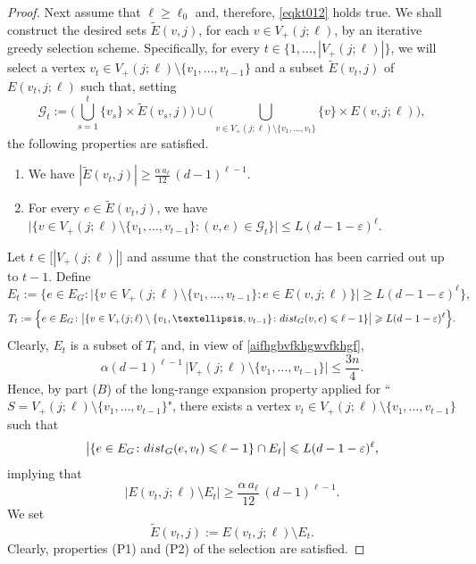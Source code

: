 \documentclass[11pt,leqno]{amsart}
\theoremstyle{remark}
\theoremstyle{plain}
\def\dist{{\rm dist}}
\def\dist{{\rm dist}}
\begin{document}
\begin{proof}
Next assume that $\ell\geqslant \ell_0$ and, therefore, \eqref{eqkt012} holds true. We shall
construct the desired sets $\tilde{E}(v,j)$, for each $v\in V_{+}(j;\ell)$, by an iterative greedy selection scheme.
Specifically, for every $t\in \big\{1,\ldots, |V_{+}(j;\ell)|\big\}$, we will select a vertex
$v_t\in V_{+}(j;\ell)\setminus \{v_1,\dots,v_{t-1}\}$ and
a subset $\tilde{E}(v_t,j)$ of $E(v_t,j;\ell)$ such that, setting
\[ \mathcal{G}_t:=
\Big(\bigcup_{s=1}^t \{v_s\}\times \tilde{E}(v_s,j)\Big)
\cup \Big(\bigcup_{v\in V_{+}(j;\ell)\setminus\{v_1,\ldots,v_t\}} \{v\}\times E(v,j;\ell)\Big),\]
the following properties are satisfied.
\begin{enumerate}
\item [(P1)] We have $|\tilde{E}(v_t,j)|\geqslant \frac{\alpha\,a_\ell}{12}\,(d-1)^{\ell-1}$.
\item [(P2)] For every $e\in \tilde{E}(v_t,j)$, we have
$\big|\{v\in V_{+}(j;\ell)\setminus\{v_1,\ldots,v_{t-1}\}\colon (v,e)\in
\mathcal{G}_t\}\big| \leqslant  L(d-1-\varepsilon)^\ell$.
\end{enumerate}
Let $t\in \big[|V_{+}(j;\ell)|\big]$ and assume that the construction has been carried out up to $t-1$.
Define
\[ E_t:=\big\{e\in E_G\colon \big|\{v\in V_{+}(j;\ell)\setminus\{v_1,\dots,v_{t-1}\}\colon
e\in E(v,j;\ell)\}\big|\geqslant L(d-1-\varepsilon)^\ell\big\}, \]
\[ T_t:= \Big\{e\in E_G\colon
\big|\{v\in V_{+}(j;\ell)\setminus\{v_1,\dots,v_{t-1}\}\colon
\dist_G(v,e)\leqslant \ell-1\}\big|\geqslant L(d-1-\varepsilon)^\ell\Big\}.\]
Clearly, $E_t$ is a subset of  $T_t$
and, in view of \eqref{aifhgbvfkhgwvfkhgf},
$$ \alpha(d-1)^{\ell-1}\, \big|V_{+}(j;\ell)\setminus\{v_1,\dots,v_{t-1}\}\big| \leqslant \frac{3n}{4}. $$
Hence, by part (\hyperref[Part-B]{$B$}) of the long-range expansion property applied for
``$S=V_{+}(j;\ell)\setminus\{v_1,\dots,v_{t-1}\}$", there exists a vertex
$v_t\in V_{+}(j;\ell)\setminus\{v_1,\dots,v_{t-1}\}$ such that
$$ \big|\{e\in E_G\colon \dist_G(e,v_t)\leqslant \ell-1\} \cap E_t\big|\leqslant L(d-1-\varepsilon)^\ell, $$
implying that
$$ |E(v_t,j;\ell)\setminus E_t| \geqslant \frac{\alpha\,a_\ell}{12}\,(d-1)^{\ell-1}. $$
We set
$$ \tilde E(v_t,j):=E(v_t,j;\ell)\setminus E_t. $$
Clearly, properties (P1) and (P2) of the selection are satisfied.


\end{proof}
\end{document}
